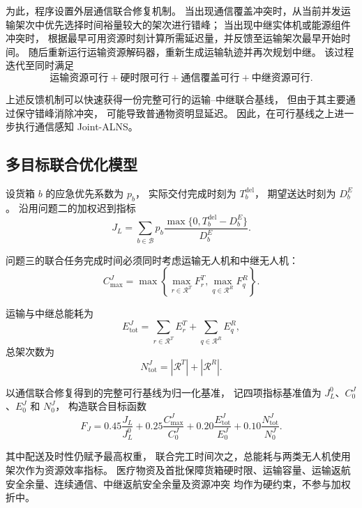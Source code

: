 为此，程序设置外层通信联合修复机制。
当出现通信覆盖冲突时，从当前并发运输架次中优先选择时间裕量较大的架次进行错峰；
当出现中继实体机或能源组件冲突时，
根据最早可用资源时刻计算所需延迟量，并反馈至运输架次最早开始时间。
随后重新运行运输资源解码器，重新生成运输轨迹并再次规划中继。
该过程迭代至同时满足
\[
\boxed{
	\text{运输资源可行}
	+\text{硬时限可行}
	+\text{通信覆盖可行}
	+\text{中继资源可行}
}.
\]

上述反馈机制可以快速获得一份完整可行的运输--中继联合基线，
但由于其主要通过保守错峰消除冲突，
可能导致普通物资明显延迟。
因此，在可行基线之上进一步执行通信感知 Joint-ALNS。

\subsection{多目标联合优化模型}

设货箱 $b$ 的应急优先系数为 $p_b$，
实际交付完成时刻为 $T_b^{\mathrm{del}}$，
期望送达时刻为 $D_b^E$。
沿用问题二的加权迟到指标
\begin{equation}
	J_L
	=\sum_{b\in\mathcal B}
	p_b
	\frac{\max\{0,T_b^{\mathrm{del}}-D_b^E\}}
	{D_b^E}.
	\label{eq:q3-lateness}
\end{equation}

问题三的联合任务完成时间必须同时考虑运输无人机和中继无人机：
\begin{equation}
	C_{\max}^{J}
	=
	\max\left\{
	\max_{r\in\mathcal R^T}F_r^T,
	\max_{q\in\mathcal R^R}F_q^R
	\right\}.
	\label{eq:q3-joint-makespan}
\end{equation}

运输与中继总能耗为
\begin{equation}
	E_{\mathrm{tot}}^{J}
	=\sum_{r\in\mathcal R^T}E_r^T
	+\sum_{q\in\mathcal R^R}E_q^R,
	\label{eq:q3-joint-energy}
\end{equation}
总架次数为
\begin{equation}
	N_{\mathrm{tot}}^{J}
	=|\mathcal R^T|+|\mathcal R^R|.
	\label{eq:q3-joint-trips}
\end{equation}

以通信联合修复得到的完整可行基线为归一化基准，
记四项指标基准值为
$J_L^0$、$C_0^J$、$E_0^J$ 和 $N_0^J$，
构造联合目标函数
\begin{equation}
	F_J
	=0.45\frac{J_L}{J_L^0}
	+0.25\frac{C_{\max}^{J}}{C_0^J}
	+0.20\frac{E_{\mathrm{tot}}^{J}}{E_0^J}
	+0.10\frac{N_{\mathrm{tot}}^{J}}{N_0^J}.
	\label{eq:q3-joint-objective}
\end{equation}

其中配送及时性仍赋予最高权重，
联合完工时间次之，总能耗与两类无人机使用架次作为资源效率指标。
医疗物资及首批保障货箱硬时限、运输容量、运输返航安全余量、连续通信、中继返航安全余量及资源冲突
均作为硬约束，不参与加权折中。

